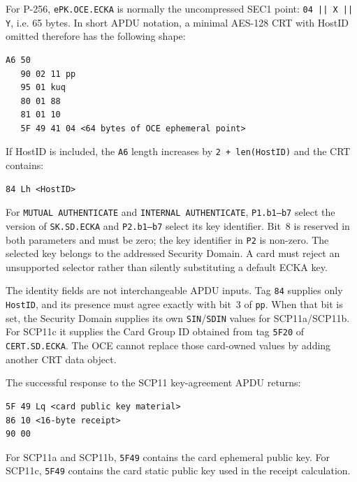 For P-256, \texttt{ePK.OCE.ECKA} is normally the uncompressed SEC1 point:
\texttt{04 || X || Y}, i.e. 65 bytes. In short APDU notation, a minimal
AES-128 CRT with HostID omitted therefore has the following shape:

\begin{verbatim}
A6 50
   90 02 11 pp
   95 01 kuq
   80 01 88
   81 01 10
   5F 49 41 04 <64 bytes of OCE ephemeral point>
\end{verbatim}

If HostID is included, the \texttt{A6} length increases by
\texttt{2 + len(HostID)} and the CRT contains:

\begin{verbatim}
84 Lh <HostID>
\end{verbatim}

For \texttt{MUTUAL AUTHENTICATE} and \texttt{INTERNAL AUTHENTICATE},
\texttt{P1.b1--b7} select the version of \texttt{SK.SD.ECKA} and
\texttt{P2.b1--b7} select its key identifier.  Bit~8 is reserved in both
parameters and must be zero; the key identifier in \texttt{P2} is non-zero.
The selected key belongs to the addressed Security Domain.  A card must reject
an unsupported selector rather than silently substituting a default ECKA key.

The identity fields are not interchangeable APDU inputs.  Tag \texttt{84}
supplies only \texttt{HostID}, and its presence must agree exactly with bit~3
of \texttt{pp}.  When that bit is set, the Security Domain supplies its own
\texttt{SIN}/\texttt{SDIN} values for SCP11a/SCP11b.  For SCP11c it supplies
the Card Group ID obtained from tag \texttt{5F20} of
\texttt{CERT.SD.ECKA}.  The OCE cannot replace those card-owned values by
adding another CRT data object.

The successful response to the SCP11 key-agreement APDU returns:

\begin{verbatim}
5F 49 Lq <card public key material>
86 10 <16-byte receipt>
90 00
\end{verbatim}

For SCP11a and SCP11b, \texttt{5F49} contains the card ephemeral public key.
For SCP11c, \texttt{5F49} contains the card static public key used in the
receipt calculation.


